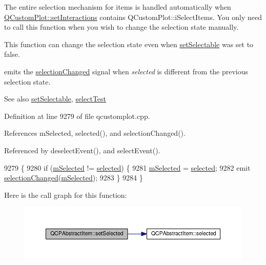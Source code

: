 The entire selection mechanism for items is handled automatically when \hyperlink{class_q_custom_plot_a5ee1e2f6ae27419deca53e75907c27e5}{Q\+Custom\+Plot\+::set\+Interactions} contains Q\+Custom\+Plot\+::i\+Select\+Items. You only need to call this function when you wish to change the selection state manually.

This function can change the selection state even when \hyperlink{class_q_c_p_abstract_item_a8a8e32a55bc478b849756a78c2d87fd2}{set\+Selectable} was set to false.

emits the \hyperlink{class_q_c_p_abstract_item_aa5cffb034fc65dbb91c77e02c1c14251}{selection\+Changed} signal when {\itshape selected} is different from the previous selection state.

\begin{DoxySeeAlso}{See also}
\hyperlink{class_q_c_p_abstract_item_a8a8e32a55bc478b849756a78c2d87fd2}{set\+Selectable}, \hyperlink{class_q_c_p_abstract_item_a96d522d10ffc0413b9a366c6f7f0476b}{select\+Test} 
\end{DoxySeeAlso}


Definition at line 9279 of file qcustomplot.\+cpp.



References m\+Selected, selected(), and selection\+Changed().



Referenced by deselect\+Event(), and select\+Event().


\begin{DoxyCode}
9279                                                \{
9280   \textcolor{keywordflow}{if} (\hyperlink{class_q_c_p_abstract_item_a4bdb3457dad1d268c0f78a44152b9645}{mSelected} != \hyperlink{class_q_c_p_abstract_item_a225865808640d8d9a7dd19f09a2e93f2}{selected}) \{
9281     \hyperlink{class_q_c_p_abstract_item_a4bdb3457dad1d268c0f78a44152b9645}{mSelected} = \hyperlink{class_q_c_p_abstract_item_a225865808640d8d9a7dd19f09a2e93f2}{selected};
9282     emit \hyperlink{class_q_c_p_abstract_item_aa5cffb034fc65dbb91c77e02c1c14251}{selectionChanged}(\hyperlink{class_q_c_p_abstract_item_a4bdb3457dad1d268c0f78a44152b9645}{mSelected});
9283   \}
9284 \}
\end{DoxyCode}


Here is the call graph for this function\+:\nopagebreak
\begin{figure}[H]
\begin{center}
\leavevmode
\includegraphics[width=350pt]{class_q_c_p_abstract_item_a203de94ad586cc44d16c9565f49d3378_cgraph}
\end{center}
\end{figure}




